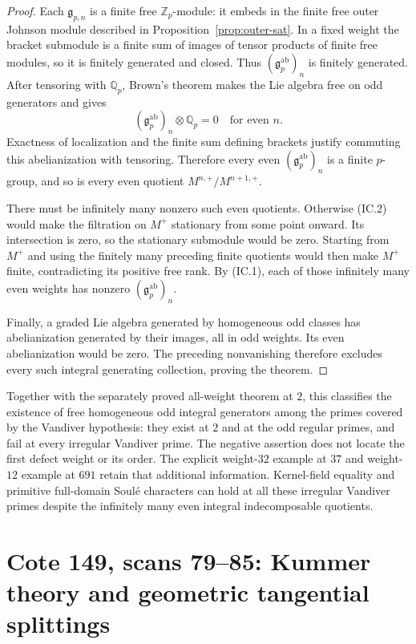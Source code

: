 \documentclass[11pt,a4paper]{article}
\theoremstyle{definition}
\begin{document}
\begin{proof}
Each $\mathfrak g_{p,n}$ is a finite free $\mathbb Z_p$-module:
it embeds in the finite free outer Johnson module described in
Proposition~\ref{prop:outer-sat}.  In a fixed weight the bracket
submodule is a finite sum of images of tensor products of finite
free modules, so it is finitely generated and closed.  Thus
$(\mathfrak g_p^{\mathrm{ab}})_n$ is finitely generated.
After tensoring with $\mathbb Q_p$, Brown's theorem makes the
Lie algebra free on odd generators and gives
\[
 (\mathfrak g_p^{\mathrm{ab}})_n\otimes\mathbb Q_p=0
 \quad\text{for even }n.
\]
Exactness of localization and the finite sum defining brackets
justify commuting this abelianization with tensoring.
Therefore every even $(\mathfrak g_p^{\mathrm{ab}})_n$ is a
finite $p$-group, and so is every even quotient
$M^{n,+}/M^{n+1,+}$.

There must be infinitely many nonzero such even quotients.
Otherwise (IC.2) would make the filtration on $M^+$ stationary
from some point onward.  Its intersection is zero, so the
stationary submodule would be zero.  Starting from $M^+$ and
using the finitely many preceding finite quotients would then
make $M^+$ finite, contradicting its positive free rank.
By (IC.1), each of those infinitely many even weights has
nonzero $(\mathfrak g_p^{\mathrm{ab}})_n$.

Finally, a graded Lie algebra generated by homogeneous odd
classes has abelianization generated by their images, all in odd
weights.  Its even abelianization would be zero.  The preceding
nonvanishing therefore excludes every such integral generating
collection, proving the theorem.
\end{proof}

Together with the separately proved all-weight theorem at $2$,
this classifies the existence of free homogeneous odd integral
generators among the primes covered by the Vandiver hypothesis:
they exist at $2$ and at the odd regular primes, and fail at every
irregular Vandiver prime.  The negative assertion does not locate
the first defect weight or its order.  The explicit weight-$32$
example at $37$ and weight-$12$ example at $691$ retain that
additional information.  Kernel-field equality and primitive
full-domain Soul\'e characters can hold at all these irregular
Vandiver primes despite the infinitely many even integral
indecomposable quotients.

\section{Cote 149, scans 79--85: Kummer theory and geometric tangential splittings}
\label{sec:archive-kummer}
\end{document}
